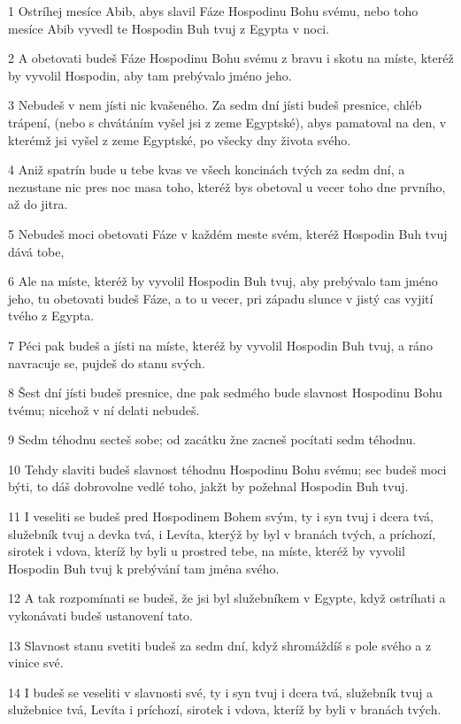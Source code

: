 \par 1 Ostríhej mesíce Abib, abys slavil Fáze Hospodinu Bohu svému, nebo toho mesíce Abib vyvedl te Hospodin Buh tvuj z Egypta v noci.
\par 2 A obetovati budeš Fáze Hospodinu Bohu svému z bravu i skotu na míste, kteréž by vyvolil Hospodin, aby tam prebývalo jméno jeho.
\par 3 Nebudeš v nem jísti nic kvašeného. Za sedm dní jísti budeš presnice, chléb trápení, (nebo s chvátáním vyšel jsi z zeme Egyptské), abys pamatoval na den, v kterémž jsi vyšel z zeme Egyptské, po všecky dny života svého.
\par 4 Aniž spatrín bude u tebe kvas ve všech koncinách tvých za sedm dní, a nezustane nic pres noc masa toho, kteréž bys obetoval u vecer toho dne prvního, až do jitra.
\par 5 Nebudeš moci obetovati Fáze v každém meste svém, kteréž Hospodin Buh tvuj dává tobe,
\par 6 Ale na míste, kteréž by vyvolil Hospodin Buh tvuj, aby prebývalo tam jméno jeho, tu obetovati budeš Fáze, a to u vecer, pri západu slunce v jistý cas vyjití tvého z Egypta.
\par 7 Péci pak budeš a jísti na míste, kteréž by vyvolil Hospodin Buh tvuj, a ráno navracuje se, pujdeš do stanu svých.
\par 8 Šest dní jísti budeš presnice, dne pak sedmého bude slavnost Hospodinu Bohu tvému; nicehož v ní delati nebudeš.
\par 9 Sedm téhodnu secteš sobe; od zacátku žne zacneš pocítati sedm téhodnu.
\par 10 Tehdy slaviti budeš slavnost téhodnu Hospodinu Bohu svému; sec budeš moci býti, to dáš dobrovolne vedlé toho, jakžt by požehnal Hospodin Buh tvuj.
\par 11 I veseliti se budeš pred Hospodinem Bohem svým, ty i syn tvuj i dcera tvá, služebník tvuj a devka tvá, i Levíta, kterýž by byl v branách tvých, a príchozí, sirotek i vdova, kteríž by byli u prostred tebe, na míste, kteréž by vyvolil Hospodin Buh tvuj k prebývání tam jména svého.
\par 12 A tak rozpomínati se budeš, že jsi byl služebníkem v Egypte, když ostríhati a vykonávati budeš ustanovení tato.
\par 13 Slavnost stanu svetiti budeš za sedm dní, když shromáždíš s pole svého a z vinice své.
\par 14 I budeš se veseliti v slavnosti své, ty i syn tvuj i dcera tvá, služebník tvuj a služebnice tvá, Levíta i príchozí, sirotek i vdova, kteríž by byli v branách tvých.

